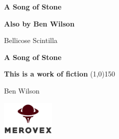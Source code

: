 \documentclass[10pt,]{book}
\begin{document}

\sloppy %
\setcounter{page}{1}
    \pagestyle{empty}
    \begin{center}
      \vspace*{\fill}

      \LARGE\textbf{\textsf{A Song of Stone}}

      \vspace*{\fill}
    \end{center}
    \clearpage

    \newpage
    \emph{ }\newline
        \begin{center}
      \textbf{Also by Ben Wilson}

            Bellicose\newline
            Scintilla\newline
          \end{center}
        \clearpage

    \pagestyle{empty}
    \begin{center}
      \vspace*{\fill}

      \Huge\textbf{\textsf{A Song of Stone}}
      
      \vspace*{0.125in}\Large\textbf{\textsf{This is a work of fiction}}
      \vspace*{0.25in}
      \line(1,0){150}
      \vspace*{0.25in}

      \Large\textsf{Ben Wilson}

      \vspace*{\fill}

      \vspace*{\fill}
            \includegraphics[width=1in]{images/logo.png}\\[0cm]
      \vspace*{0.25in}
          \end{center}
    \clearpage
\end{document}
